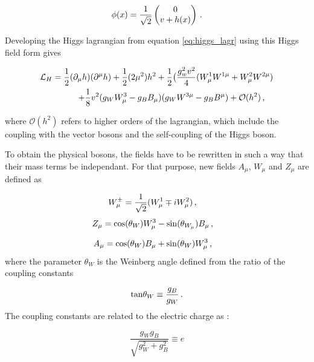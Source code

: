 \begin{equation}
    \phi(x) = \frac{1}{\sqrt{2}} \begin{pmatrix} 0 \\ v + h(x) \end{pmatrix} \mend
    \label{eq:simphiggsfield}
\end{equation}

Developing the Higgs lagrangian from equation \ref{eq:higgs_lagr} using this Higgs field form gives

\begin{align}
    \Lagr_H = \frac{1}{2}(\partial_{\mu}h)(\partial^{\mu}h) + \frac{1}{2}(2\mu^2 )h^2 + \frac{1}{2} \big( \frac{g^{2}_w v^2}{4} (W_{\mu}^1 W^{1\mu} + W_{\mu}^2 W^{2\mu}) \\ + \frac{1}{8} v^2 (g_W W_{\mu}^3 - g_B B_{\mu})(g_W W^{3\mu} - g_B B^{\mu}) + \mathcal{O}(h^2) \msep
    \label{eq:hlagr}
\end{align}

where $\mathcal{O}(h^2)$ refers to higher orders of the lagrangian, which include the coupling with the vector bosons and the self-coupling of the Higgs boson.

To obtain the physical bosons, the fields have to be rewritten in such a way that their mass terms be independant. For that purpose, new fields $A_{\mu}$, $W_{\mu}$ and $Z_{\mu}$ are defined as

\begin{equation}
    W^{\pm}_\mu = \frac{1}{\sqrt{2}}(W_{\mu}^1 \mp iW_{\mu}^2) \msep
\end{equation}
\begin{equation}
    Z_{\mu} = \mathrm{cos}(\theta_{W})W^3_{\mu} - \mathrm{sin}(\theta_{W_{\mu}})B_{\mu} \msep
\end{equation}

\begin{equation}
    A_{\mu} = \mathrm{cos}(\theta_{W})B_{\mu} + \mathrm{sin}(\theta_{W})W_{\mu}^3 \msep
\end{equation}
where the parameter $\theta_W$ is the Weinberg angle \cite{GLASHOW1961579} defined from the ratio of the coupling constants

\begin{equation}
    \mathrm{tan} \theta_W \equiv \frac{g_B}{g_W} \mend
\end{equation}
The coupling constants are related to the electric charge as :

\begin{equation}
    \frac{g_W g_B}{\sqrt{g_{W}^2 + g^{2}_B}} \equiv e
\end{equation}


